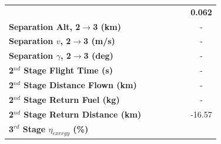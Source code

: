 \begin{table}[ht]
\begin{tabular}{l c c c c c c}
		& \textbf{\secondExergyEffmThreeNinety}
		& \textbf{\secondExergyEffmThreeNinetyFive}
		& \textbf{\secondExergyEffmThreeStandard}
		& \textbf{\secondExergyEffmThreeOneHundredFive}
		& \textbf{\secondExergyEffmThreeOneHundredTen}
		& \textbf{0.062}
		\\
		\textbf{Separation Alt, 2$\rightarrow$3 (km)}
		& \secondthirdSeparationAltmThreeNinety
		& \secondthirdSeparationAltmThreeNinetyFive
		& \secondthirdSeparationAltmThreeStandard
		& \secondthirdSeparationAltmThreeOneHundredFive
		& \secondthirdSeparationAltmThreeOneHundredTen
		& -
		\\
		\textbf{Separation $v$, 2$\rightarrow$3 (m/s)}
		& \secondthirdSeparationvmThreeNinety
		& \secondthirdSeparationvmThreeNinetyFive
		& \secondthirdSeparationvmThreeStandard
		& \secondthirdSeparationvmThreeOneHundredFive
		& \secondthirdSeparationvmThreeOneHundredTen
		& -
		\\
		\textbf{Separation $\gamma$, 2$\rightarrow$3 (deg)}
		& \secondthirdSeparationgammamThreeNinety
		& \secondthirdSeparationgammamThreeNinetyFive
		& \secondthirdSeparationgammamThreeStandard
		& \secondthirdSeparationgammamThreeOneHundredFive
		& \secondthirdSeparationgammamThreeOneHundredTen
		& -
		\\
		\textbf{2$^{nd}$ Stage Flight Time (s)}
		& \secondFlightTimemThreeNinety
		& \secondFlightTimemThreeNinetyFive
		& \secondFlightTimemThreeStandard
		& \secondFlightTimemThreeOneHundredFive
		& \secondFlightTimemThreeOneHundredTen
		& -
		\\
		\textbf{2$^{nd}$ Stage Distance Flown (km)}
		& \SecondDistmThreeNinety
		& \SecondDistmThreeNinetyFive
		& \SecondDistmThreeStandard
		& \SecondDistmThreeOneHundredFive
		& \SecondDistmThreeOneHundredTen
		& -
		\\
		\textbf{2$^{nd}$ Stage Return Fuel (kg)}
		& \returnFuelmThreeNinety
		& \returnFuelmThreeNinetyFive
		& \returnFuelmThreeStandard
		& \returnFuelmThreeOneHundredFive
		& \returnFuelmThreeOneHundredTen
		& -
		\\
		\textbf{2$^{nd}$ Stage Return Distance (km)}
		& \returnDistmThreeNinety
		& \returnDistmThreeNinetyFive
		& \returnDistmThreeStandard
		& \returnDistmThreeOneHundredFive
		& \returnDistmThreeOneHundredTen
		&-16.57
		\\
		\hline 
		\textbf{3$^{rd}$ Stage $\eta_{exergy}$ (\%)}
		& \textbf{\thirddExergyEffmThreeNinety}
		& \textbf{\thirddExergyEffmThreeNinetyFive}
		& \textbf{\thirddExergyEffmThreeStandard}
		& \textbf{\thirddExergyEffmThreeOneHundredFive}
		& \textbf{\thirddExergyEffmThreeOneHundredTen}

\end{tabular}
\end{table}
